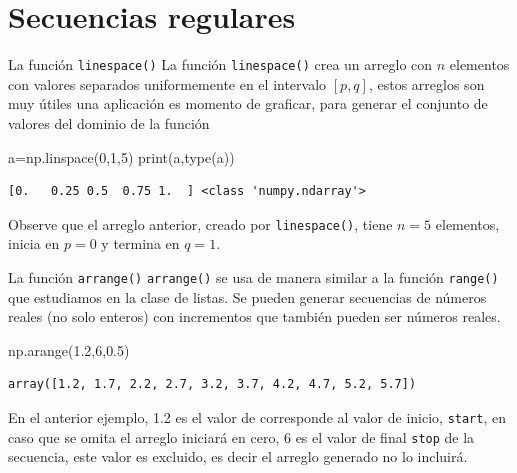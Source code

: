 \documentclass[
  ignorenonframetext,
  aspectratio=169,
  spanish,
]{beamer}
\newenvironment{Shaded}{\begin{snugshade}}{\end{snugshade}}
\newcommand{\BuiltInTok}[1]{\textcolor[rgb]{0.00,0.23,0.31}{#1}}
\newcommand{\DecValTok}[1]{\textcolor[rgb]{0.68,0.00,0.00}{#1}}
\newcommand{\FloatTok}[1]{\textcolor[rgb]{0.68,0.00,0.00}{#1}}
\newcommand{\NormalTok}[1]{\textcolor[rgb]{0.00,0.23,0.31}{#1}}
\newcommand{\OperatorTok}[1]{\textcolor[rgb]{0.37,0.37,0.37}{#1}}
\begin{document}
\section{Secuencias regulares}\label{secuencias-regulares}

\begin{frame}[fragile]{La función \texttt{linespace()}}
\label{la-funciuxf3n-linespace}
La función \texttt{linespace()} crea un arreglo con \(n\) elementos con
valores separados uniformemente en el intervalo \([p,q]\), estos
arreglos son muy útiles una aplicación es momento de graficar, para
generar el conjunto de valores del dominio de la función

\begin{Shaded}
\begin{Highlighting}[]
\NormalTok{a}\OperatorTok{=}\NormalTok{np.linspace(}\DecValTok{0}\NormalTok{,}\DecValTok{1}\NormalTok{,}\DecValTok{5}\NormalTok{) }
\BuiltInTok{print}\NormalTok{(a,}\BuiltInTok{type}\NormalTok{(a)) }
\end{Highlighting}
\end{Shaded}

\begin{verbatim}
[0.   0.25 0.5  0.75 1.  ] <class 'numpy.ndarray'>
\end{verbatim}

Observe que el arreglo anterior, creado por \texttt{linespace()}, tiene
\(n=5\) elementos, inicia en \(p=0\) y termina en \(q=1\).
\end{frame}

\begin{frame}[fragile]{La función \texttt{arrange()}}
\label{la-funciuxf3n-arrange}
\texttt{arrange()} se usa de manera similar a la función
\texttt{range()} que estudiamos en la clase de listas. Se pueden generar
secuencias de números reales (no solo enteros) con incrementos que
también pueden ser números reales.

\begin{Shaded}
\begin{Highlighting}[]
\NormalTok{np.arange(}\FloatTok{1.2}\NormalTok{,}\DecValTok{6}\NormalTok{,}\FloatTok{0.5}\NormalTok{)}
\end{Highlighting}
\end{Shaded}

\begin{verbatim}
array([1.2, 1.7, 2.2, 2.7, 3.2, 3.7, 4.2, 4.7, 5.2, 5.7])
\end{verbatim}

En el anterior ejemplo, 1.2 es el valor de corresponde al valor de
inicio, \texttt{start}, en caso que se omita el arreglo iniciará en
cero, 6 es el valor de final \texttt{stop} de la secuencia, este valor
es excluido, es decir el arreglo generado no lo incluirá.
\end{frame}
\end{document}
